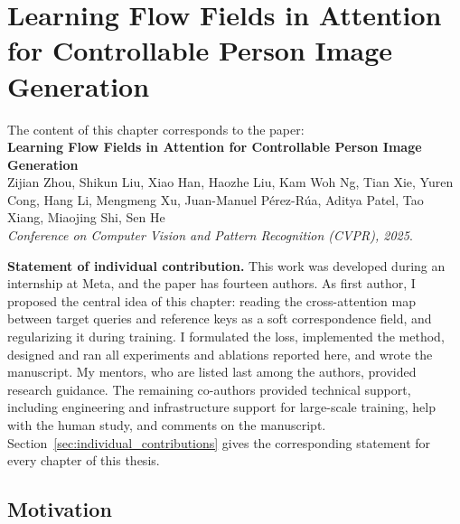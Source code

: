 \chapter{Learning Flow Fields in Attention for Controllable Person Image Generation}

\begin{tcolorbox}[
    breakable,
    colback=gray!5,
    colframe=black,
]
The content of this chapter corresponds to the paper: \\
\noindent \textbf{Learning Flow Fields in Attention for Controllable Person Image Generation} \\
\noindent Zijian Zhou, Shikun Liu, Xiao Han, Haozhe Liu, Kam Woh Ng, Tian Xie, Yuren Cong, Hang Li, Mengmeng Xu, Juan-Manuel Pérez-Rúa, Aditya Patel, Tao Xiang, Miaojing Shi, Sen He \\
\noindent \textit{Conference on Computer Vision and Pattern Recognition (CVPR), 2025}.

\vspace{0.6em}
\noindent \textbf{Statement of individual contribution.}
This work was developed during an internship at Meta, and the paper has fourteen authors. As first author, I proposed the central idea of this chapter: reading the cross-attention map between target queries and reference keys as a soft correspondence field, and regularizing it during training. I formulated the \leffa{} loss, implemented the method, designed and ran all experiments and ablations reported here, and wrote the manuscript. My mentors, who are listed last among the authors, provided research guidance. The remaining co-authors provided technical support, including engineering and infrastructure support for large-scale training, help with the human study, and comments on the manuscript. Section~\ref{sec:individual_contributions} gives the corresponding statement for every chapter of this thesis.
\end{tcolorbox}

\section{Motivation}







